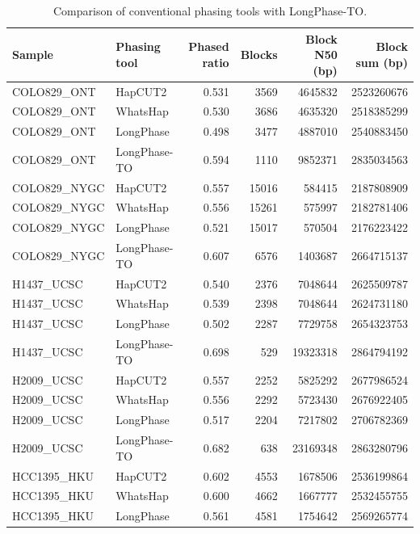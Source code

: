 \documentclass[pdflatex,sn-nature]{sn-jnl}
\begin{document}
\begin{table}[htbp]
  \centering
  \caption[Comparison of phasing tools]%
  {Comparison of conventional phasing tools with LongPhase-TO.}
  \label{tab:phasing-performance}
  \begin{tabular}{@{}llrrrr@{}}
    \toprule
    Sample & Phasing tool & Phased ratio & Blocks & Block N50 (bp) & Block sum (bp) \\
    \midrule
    COLO829\_ONT & HapCUT2      & 0.531 & 3569  & 4645832  & 2523260676 \\
    COLO829\_ONT & WhatsHap     & 0.530 & 3686  & 4635320  & 2518385299 \\
    COLO829\_ONT & LongPhase    & 0.498 & 3477  & 4887010  & 2540883450 \\
    COLO829\_ONT & LongPhase-TO & 0.594 & 1110  & 9852371  & 2835034563 \\
    \addlinespace
    COLO829\_NYGC & HapCUT2      & 0.557 & 15016 & 584415   & 2187808909 \\
    COLO829\_NYGC & WhatsHap     & 0.556 & 15261 & 575997   & 2182781406 \\
    COLO829\_NYGC & LongPhase    & 0.521 & 15017 & 570504   & 2176223422 \\
    COLO829\_NYGC & LongPhase-TO & 0.607 & 6576  & 1403687  & 2664715137 \\
    \addlinespace
    H1437\_UCSC & HapCUT2      & 0.540 & 2376  & 7048644  & 2625509787 \\
    H1437\_UCSC & WhatsHap     & 0.539 & 2398  & 7048644  & 2624731180 \\
    H1437\_UCSC & LongPhase    & 0.502 & 2287  & 7729758  & 2654323753 \\
    H1437\_UCSC & LongPhase-TO & 0.698 & 529   & 19323318 & 2864794192 \\
    \addlinespace
    H2009\_UCSC & HapCUT2      & 0.557 & 2252  & 5825292  & 2677986524 \\
    H2009\_UCSC & WhatsHap     & 0.556 & 2292  & 5723430  & 2676922405 \\
    H2009\_UCSC & LongPhase    & 0.517 & 2204  & 7217802  & 2706782369 \\
    H2009\_UCSC & LongPhase-TO & 0.682 & 638   & 23169348 & 2863280796 \\
    \addlinespace
    HCC1395\_HKU & HapCUT2      & 0.602 & 4553  & 1678506  & 2536199864 \\
    HCC1395\_HKU & WhatsHap     & 0.600 & 4662  & 1667777  & 2532455755 \\
    HCC1395\_HKU & LongPhase    & 0.561 & 4581  & 1754642  & 2569265774 \\

\end{tabular}
\end{table}
\end{document}
